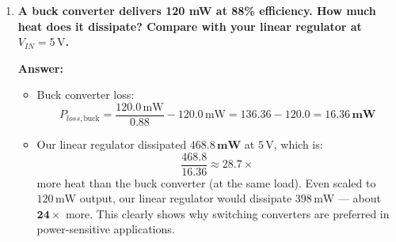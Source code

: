 \documentclass[11pt,a4paper]{article}
\begin{document}
\begin{enumerate}[label=\textbf{Q\arabic*.}, leftmargin=2.0em, itemsep=0.8em]
    \textbf{Answer:}
    \begin{itemize}[leftmargin=1.2em, itemsep=0.1em]
        \item When fully ON: $v_{DS} \approx I_D \cdot R_{DS(\text{on})} \approx 0$, so $p = v_{DS} \cdot i_D \approx 0$. When fully OFF: $i_D = 0$, so $p = 0$ even though $v_{DS} = V_{IN}$. In both steady states, one of the two terms in $p = v \cdot i$ is (nearly) zero.
        \item Two remaining losses:
        \begin{enumerate}[label=(\alph*),leftmargin=1.2em]
            \item \textbf{Switching transition loss:} During the finite rise/fall time, both $v_{DS}$ and $i_D$ are non-zero simultaneously. $P_{sw} \approx \frac{1}{2} V_{IN} I_{LOAD} (t_r + t_f) f_{sw}$.
            \item \textbf{Conduction loss:} Ohmic drop in the MOSFET ($I_{RMS}^2 R_{DS(\text{on})}$) and inductor winding resistance ($I_{LOAD}^2 R_{DCR}$).
        \end{enumerate}
    \end{itemize}

    \item \textbf{A buck converter delivers 120 mW at 88\% efficiency. How much heat does it dissipate? Compare with your linear regulator at $V_{IN} = 5\,\text{V}$.}

    \textbf{Answer:}
    \begin{itemize}[leftmargin=1.2em, itemsep=0.1em]
        \item Buck converter loss:
        \begin{equation}
            P_{loss,\text{buck}} = \frac{120.0\,\text{mW}}{0.88} - 120.0\,\text{mW} = 136.36 - 120.0 = \mathbf{16.36\,\text{mW}}
        \end{equation}
        \item Our linear regulator dissipated $\mathbf{468.8\,\text{mW}}$ at $5\,\text{V}$, which is:
        \begin{equation}
            \frac{468.8}{16.36} \approx \mathbf{28.7\times}
        \end{equation}
        more heat than the buck converter (at the same load). Even scaled to $120\,\text{mW}$ output, our linear regulator would dissipate $398\,\text{mW}$ --- about $\mathbf{24\times}$ more. This clearly shows why switching converters are preferred in power-sensitive applications.
    \end{itemize}
\end{enumerate}
\end{document}
